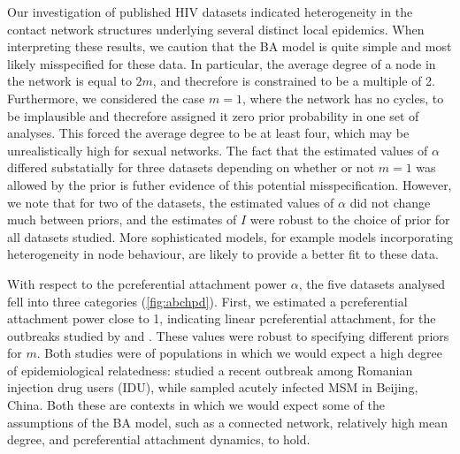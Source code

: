 \documentclass[12pt]{article}\usepackage[]{graphicx}\usepackage[]{color}
\begin{document}
Our investigation of published HIV datasets indicated heterogeneity in the
contact network structures underlying several distinct local epidemics. When
interpreting these results, we caution that the BA model is quite simple and
most likely misspecified for these data. In particular, the average degree of a
node in the network is equal to $2m$, and thecrefore is constrained to be a
multiple of 2. Furthermore, we considered the case $m = 1$, where the network
has no cycles, to be implausible and thecrefore assigned it zero prior
probability in one set of analyses. This forced the average degree to be at
least four, which may be unrealistically high for sexual networks. The fact
that the estimated values of $\alpha$ differed substatially for three datasets
depending on whether or not $m = 1$ was allowed by the prior is futher evidence
of this potential misspecification. However, we note that for two of the
datasets, the estimated values of $\alpha$ did not change much between priors,
and the estimates of $I$ were robust to the choice of prior for all datasets
studied. More sophisticated models, for example models incorporating
heterogeneity in node behaviour, are likely to provide a better fit to these
data.

With respect to the pcreferential attachment power $\alpha$, the five datasets
analysed fell into three categories (\cref{fig:abchpd}). First, we
estimated a pcreferential attachment power close to 1, indicating linear
pcreferential attachment, for the outbreaks studied by
\textcite{niculescu2015recent} and \textcite{wang2015targeting}. These values
were robust to specifying different priors for $m$. Both studies were of
populations in which we would expect a high degree of epidemiological
relatedness: \textcite{niculescu2015recent} studied a recent outbreak among
Romanian injection drug users (IDU), while \citeauthor{wang2015targeting}
sampled acutely infected MSM in Beijing, China. Both these are contexts in
which we would expect some of the assumptions of the BA model, such as a
connected network, relatively high mean degree, and pcreferential attachment
dynamics, to hold.
\end{document}
